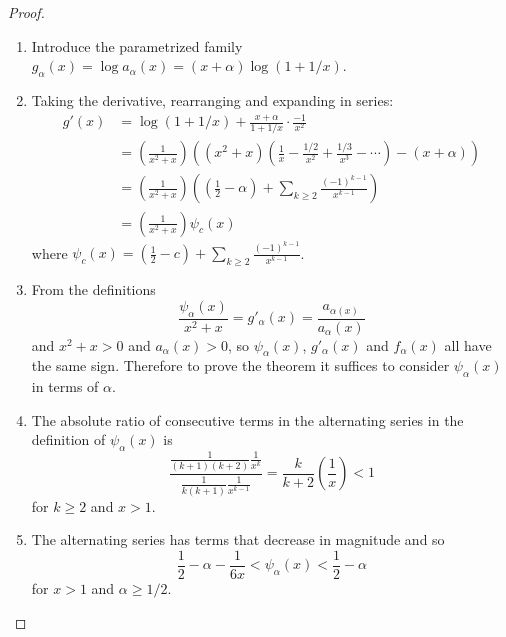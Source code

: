 \documentclass[12pt]{article}
\begin{document}
\begin{proof}
    \begin{enumerate}
        \item
            Introduce the parametrized family \( g_{\alpha}(x) = \log a_{\alpha}
            (x) = (x + \alpha) \log(1 + 1/x) \).
        \item
            Taking the derivative, rearranging and expanding in series:
            \begin{align*}
                g'(x) &= \log(1 + 1/x) + \frac{x+\alpha}{1 + 1/x} \cdot
                \frac{-1}{x^2} \\
                &= \left( \frac{1}{x^2 + x} \right) \left( (x^2 + x)
                \left( \frac{1}{x} - \frac{1/2}{x^2} + \frac{1/3}{x^3} -
                \cdots \right) - (x + \alpha) \right) \\
                &= \left( \frac{1}{x^2 + x} \right) \left( (\frac{1}{2}
                -\alpha) + \sum\limits_{k \ge 2} \frac{(-1)^{k-1}}{x^{k-1}}
                \right) \\
                &= \left( \frac{1}{x^2 + x} \right)\psi_c(x)
            \end{align*}
            where \( \psi_c(x) = \left( \frac{1}{2} - c \right) + \sum\limits_
            {k \ge 2} \frac{(-1)^{k-1}}{x^{k-1}} \).
        \item
            From the definitions
            \[
                \frac{\psi_{\alpha}(x)}{x^2 +x} = g'_{\alpha}(x) = \frac
                {a_{\alpha(x)}}{a_{\alpha}(x)}
            \] and \( x^2 + x > 0 \) and \( a_{\alpha}(x) > 0 \), so \(
            \psi_{\alpha}(x) \), \( g'_{\alpha}(x) \) and \( f_{\alpha}(x)
            \) all have the same sign. Therefore to prove the theorem it
            suffices to consider \( \psi_{\alpha}(x) \) in terms of \(
            \alpha \).
        \item
            The absolute ratio of consecutive terms in the alternating
            series in the definition of \( \psi_{\alpha}(x) \) is
            \[
                \frac{ \frac{1}{(k+1)(k+2)} \frac{1}{x^k}}{\frac{1}{k(k+1)}
                \frac{1}{x^{k-1}}} = \frac{k}{k+2} \left( \frac{1}{x}
                \right) < 1
            \] for \( k \ge 2 \) and \( x > 1 \).
        \item
            The alternating series has terms that decrease in magnitude
            and so
            \[
                \frac{1}{2} - \alpha - \frac{1}{6x} < \psi_{\alpha}(x) <
                \frac{1}{2} - \alpha
            \] for \( x > 1 \) and \( \alpha \ge 1/2 \).

\end{enumerate}
\end{proof}
\end{document}

